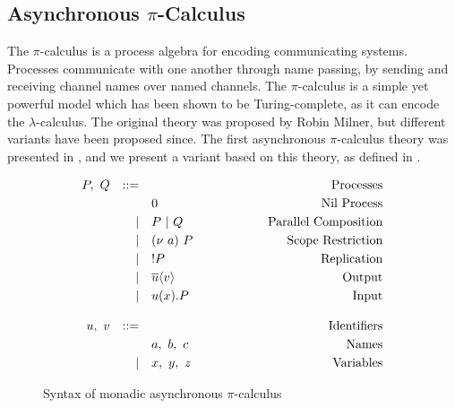 \documentclass[12pt,twoside]{report}
\newcommand{\white}{\ \ \ \ \ \ \ \ \ \ \ \ }
\begin{document}
\subsection{Asynchronous $\pi$-Calculus}\label{pi-calculus}
The $\pi$-calculus is a process algebra for encoding communicating systems. Processes communicate with one another through name passing, by sending and receiving channel names over named channels. The $\pi$-calculus is a simple yet powerful model which has been shown to be Turing-complete\cite{turingcomplete}, as it can encode the $\lambda$-calculus. The original theory was proposed by Robin Milner\cite{milnerpicalc}, but different variants have been proposed since. The first asynchronous $\pi$-calculus theory was presented in \cite{asyncandpicalc}, and we present a variant based on this theory, as defined in \cite{co406}.

\begin{figure}[h]
    \centering
    \begin{equation*}
    \centering
    \begin{array}{rrlcr}
        P,\ Q & ::= && \white & \text{Processes} \\[2.75pt]
             &   & 0 & \white & \text{Nil\ Process}  \\[2.75pt]
             & | & P\ |\ Q & \white & \text{Parallel\ Composition} \\[2.75pt]
             & | & (\nu\ a)\ P & \white & \text{Scope Restriction} \\[2.75pt]
             & | & !P & \white  & \text{Replication} \\[2.75pt]
             & | & \overline{u}\langle v \rangle & \white & \text{Output} \\[2.75pt] 
             & | & u(x).P & \white & \text{Input} \\\\
        u,\ v & ::= && \white & \text{Identifiers} \\[2.75pt]
              &   & a,\ b,\ c & \white & \text{Names} \\[2.75pt]
              & | & x,\ y,\ z & \white & \text{Variables} \\
        \end{array}
    \end{equation*}
    \caption{Syntax of monadic asynchronous  $\pi$-calculus}
    \label{picalc_syntax}
\end{figure}{}
\end{document}
